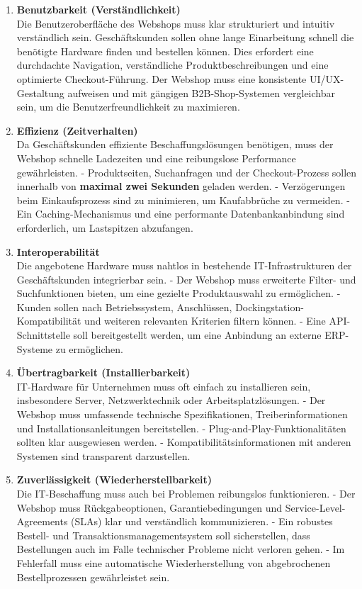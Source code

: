\documentclass[%
	12pt,
	a4paper,
	oneside,
	parskip=full
]{scrbook}
\begin{document}
\begin{enumerate}
	\item \textbf{Benutzbarkeit (Verständlichkeit)} \\
	Die Benutzeroberfläche des Webshops muss klar strukturiert und intuitiv verständlich sein. Geschäftskunden sollen ohne lange Einarbeitung schnell die benötigte Hardware finden und bestellen können. Dies erfordert eine durchdachte Navigation, verständliche Produktbeschreibungen und eine optimierte Checkout-Führung.  
	Der Webshop muss eine konsistente UI/UX-Gestaltung aufweisen und mit gängigen B2B-Shop-Systemen vergleichbar sein, um die Benutzerfreundlichkeit zu maximieren.
	
	\item \textbf{Effizienz (Zeitverhalten)} \\
	Da Geschäftskunden effiziente Beschaffungslösungen benötigen, muss der Webshop schnelle Ladezeiten und eine reibungslose Performance gewährleisten.  
	- Produktseiten, Suchanfragen und der Checkout-Prozess sollen innerhalb von \textbf{maximal zwei Sekunden} geladen werden.  
	- Verzögerungen beim Einkaufsprozess sind zu minimieren, um Kaufabbrüche zu vermeiden.  
	- Ein Caching-Mechanismus und eine performante Datenbankanbindung sind erforderlich, um Lastspitzen abzufangen.
	
	\item \textbf{Interoperabilität} \\
	Die angebotene Hardware muss nahtlos in bestehende IT-Infrastrukturen der Geschäftskunden integrierbar sein.  
	- Der Webshop muss erweiterte Filter- und Suchfunktionen bieten, um eine gezielte Produktauswahl zu ermöglichen.  
	- Kunden sollen nach Betriebssystem, Anschlüssen, Dockingstation-Kompatibilität und weiteren relevanten Kriterien filtern können.  
	- Eine API-Schnittstelle soll bereitgestellt werden, um eine Anbindung an externe ERP-Systeme zu ermöglichen.
	
	\item \textbf{Übertragbarkeit (Installierbarkeit)} \\
	IT-Hardware für Unternehmen muss oft einfach zu installieren sein, insbesondere Server, Netzwerktechnik oder Arbeitsplatzlösungen.  
	- Der Webshop muss umfassende technische Spezifikationen, Treiberinformationen und Installationsanleitungen bereitstellen.  
	- Plug-and-Play-Funktionalitäten sollten klar ausgewiesen werden.  
	- Kompatibilitätsinformationen mit anderen Systemen sind transparent darzustellen.
	
	\item \textbf{Zuverlässigkeit (Wiederherstellbarkeit)} \\
	Die IT-Beschaffung muss auch bei Problemen reibungslos funktionieren.  
	- Der Webshop muss Rückgabeoptionen, Garantiebedingungen und Service-Level-Agreements (SLAs) klar und verständlich kommunizieren.  
	- Ein robustes Bestell- und Transaktionsmanagementsystem soll sicherstellen, dass Bestellungen auch im Falle technischer Probleme nicht verloren gehen.  
	- Im Fehlerfall muss eine automatische Wiederherstellung von abgebrochenen Bestellprozessen gewährleistet sein.  
\end{enumerate}
\end{document}
